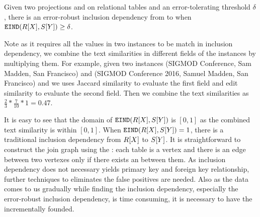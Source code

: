 \begin{definition}
Given two projections \RX and \SY on relational tables and an error-tolerating threshold $\delta$, there is an error-robust inclusion dependency from \X to \Y when $\texttt{EIND}(R[X],S[Y])\geq\delta$.
\end{definition}


Note as it requires all the values in two instances to be match in inclusion dependency, we combine the text  similarities in different fields of the instances by multiplying them. For example, given two instances \textsf{(SIGMOD Conference, Sam Madden, San Francisco)} and \textsf{(SIGMOD Conference 2016, Samuel Madden, San Francisco)} and we uses Jaccard similarity to evaluate the first field and edit similarity to evaluate the second field. Then we combine the text similarities as $\frac{2}{3}*\frac{7}{10}*1=0.47$.

It is easy to see that the domain of $\texttt{EIND}(R[X],S[Y])$ is $[0,1]$ as the combined text similarity is within $[0,1]$. When $\texttt{EIND}(R[X],S[Y])=1$, there is a traditional inclusion dependency from $R[X]$ to $S[Y]$. It is straightforward to construct the join graph using the \eind: each table is a vertex and there is an edge between two vertexes only if there exists an \eind between them. As inclusion dependency does not necessary yields primary key and foreign key relationship, further techniques to eliminates the false positives are needed. Also as the data comes to us gradually while finding the inclusion dependency, especially the error-robust inclusion dependency, is time consuming, it is necessary to have the \eind incrementally founded. %










